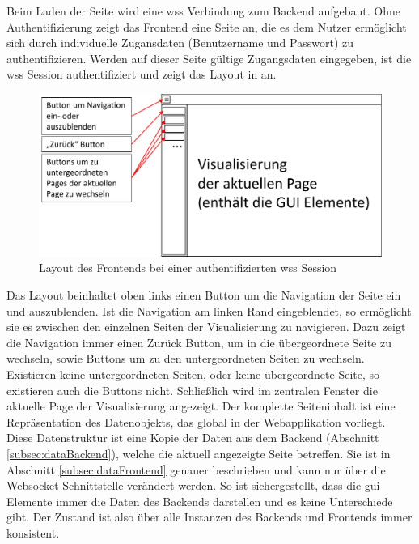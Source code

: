 Beim Laden der Seite wird eine \ac{wss} Verbindung zum Backend aufgebaut.
Ohne Authentifizierung zeigt das Frontend eine Seite an, 
die es dem Nutzer ermöglicht sich durch individuelle Zugansdaten (Benutzername und Passwort) zu authentifizieren. %
Werden auf dieser Seite gültige Zugangsdaten eingegeben, ist die \ac{wss} Session authentifiziert und 
zeigt das Layout in  an.
\begin{figure}[ht]
  \centering
  \includegraphics[width=\textwidth]{content/hauptteil/systemEntwurf/res/LayoutFrontend.pdf}
  \caption[Frontend Layout]{Layout des Frontends bei einer authentifizierten \acs{wss} Session}
  \label{fig:pageLayoutFrontendAuthenticated}
\end{figure}
Das Layout beinhaltet oben links einen Button um die Navigation der Seite ein und auszublenden.
Ist die Navigation am linken Rand eingeblendet, so ermöglicht sie es zwischen den einzelnen Seiten der Visualisierung zu navigieren.
Dazu zeigt die Navigation immer einen \glqq Zurück\grqq{} Button, um in die übergeordnete Seite zu wechseln, sowie Buttons um zu den untergeordneten Seiten zu wechseln.
Existieren keine untergeordneten Seiten, oder keine übergeordnete Seite, so existieren auch die Buttons nicht.
Schließlich wird im zentralen Fenster die aktuelle Page der Visualisierung angezeigt.
Der komplette Seiteninhalt ist eine Repräsentation des Datenobjekts, das global in der Webapplikation vorliegt.
Diese Datenstruktur ist eine Kopie der Daten aus dem Backend (Abschnitt \ref{subsec:dataBackend}), welche die aktuell angezeigte Seite betreffen.
Sie ist in Abschnitt \ref{subsec:dataFrontend} genauer beschrieben und kann nur über die Websocket Schnittstelle verändert werden. 
So ist sichergestellt, dass die \ac{gui} Elemente immer die Daten des Backends darstellen und es keine Unterschiede gibt.
Der Zustand ist also über alle Instanzen des Backends und Frontends immer konsistent.
